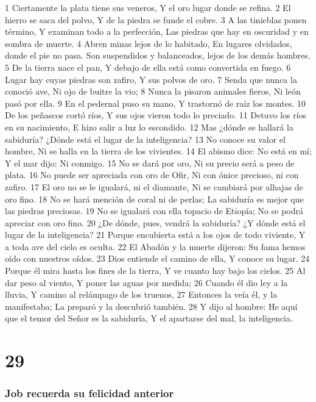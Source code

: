 1 Ciertamente la plata tiene sus veneros,  
Y el oro lugar donde se refina.  
2 El hierro se saca del polvo,  
Y de la piedra se funde el cobre.  
3 A las tinieblas ponen término,  
Y examinan todo a la perfección,  
Las piedras que hay en oscuridad y en sombra de muerte. 
4 Abren minas lejos de lo habitado,  
En lugares olvidados, donde el pie no pasa.  
Son suspendidos y balanceados, lejos de los demás hombres.  
5 De la tierra nace el pan,  
Y debajo de ella está como convertida en fuego.  
6 Lugar hay cuyas piedras son zafiro,  
Y sus polvos de oro.  
7 Senda que nunca la conoció ave,  
Ni ojo de buitre la vio;  
8 Nunca la pisaron animales fieros,  
Ni león pasó por ella.  
9 En el pedernal puso su mano,  
Y trastornó de raíz los montes.  
10 De los peñascos cortó ríos,  
Y sus ojos vieron todo lo preciado.  
11 Detuvo los ríos en su nacimiento,  
E hizo salir a luz lo escondido.  
12 Mas ¿dónde se hallará la sabiduría?  
¿Dónde está el lugar de la inteligencia?  
13 No conoce su valor el hombre,  
Ni se halla en la tierra de los vivientes.  
14 El abismo dice: No está en mí;  
Y el mar dijo: Ni conmigo.  
15 No se dará por oro,  
Ni su precio será a peso de plata.  
16 No puede ser apreciada con oro de Ofir,  
Ni con ónice precioso, ni con zafiro.  
17 El oro no se le igualará, ni el diamante,  
Ni se cambiará por alhajas de oro fino.  
18 No se hará mención de coral ni de perlas;  
La sabiduría es mejor que las piedras preciosas.  
19 No se igualará con ella topacio de Etiopía;  
No se podrá apreciar con oro fino.  
20 ¿De dónde, pues, vendrá la sabiduría?  
¿Y dónde está el lugar de la inteligencia?  
21 Porque encubierta está a los ojos de todo viviente,  
Y a toda ave del cielo es oculta.  
22 El Abadón y la muerte dijeron:  
Su fama hemos oído con nuestros oídos.  
23 Dios entiende el camino de ella,  
Y conoce su lugar.  
24 Porque él mira hasta los fines de la tierra,  
Y ve cuanto hay bajo los cielos.  
25 Al dar peso al viento,  
Y poner las aguas por medida;  
26 Cuando él dio ley a la lluvia,  
Y camino al relámpago de los truenos,  
27 Entonces la veía él, y la manifestaba;  
La preparó y la descubrió también.  
28 Y dijo al hombre:  
He aquí que el temor del Señor es la sabiduría, 
Y el apartarse del mal, la inteligencia.  

\chapter{29}

\subsection*{Job recuerda su felicidad anterior}  

